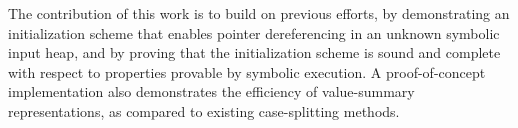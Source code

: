 The contribution of this work is to build on previous efforts, by demonstrating an initialization scheme that enables pointer dereferencing in an unknown symbolic input heap, and by proving that the initialization scheme is sound and complete with respect to properties provable by symbolic execution. A proof-of-concept implementation also demonstrates the efficiency of value-summary representations, as compared to existing case-splitting methods.  

